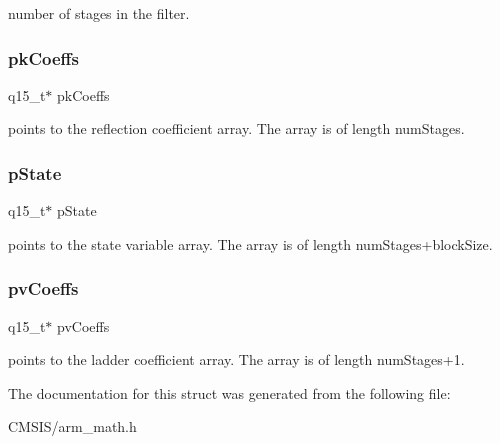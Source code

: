 number of stages in the filter. \mbox{\label{structarm__iir__lattice__instance__q15_a12497c299b0341c18d497f8ab3465084}} 
\subsubsection{\texorpdfstring{pkCoeffs}{pkCoeffs}}
{\footnotesize\ttfamily q15\+\_\+t$\ast$ pk\+Coeffs}

points to the reflection coefficient array. The array is of length num\+Stages. \mbox{\label{structarm__iir__lattice__instance__q15_ae29dfdb736374fcddaeaec4b7770170c}} 
\subsubsection{\texorpdfstring{pState}{pState}}
{\footnotesize\ttfamily q15\+\_\+t$\ast$ p\+State}

points to the state variable array. The array is of length num\+Stages+block\+Size. \mbox{\label{structarm__iir__lattice__instance__q15_a52866ed127c7b2a8a102e2ed1a2ebab8}} 
\subsubsection{\texorpdfstring{pvCoeffs}{pvCoeffs}}
{\footnotesize\ttfamily q15\+\_\+t$\ast$ pv\+Coeffs}

points to the ladder coefficient array. The array is of length num\+Stages+1. 

The documentation for this struct was generated from the following file\+:\begin{DoxyCompactItemize}
\item 
C\+M\+S\+I\+S/arm\+\_\+math.\+h\end{DoxyCompactItemize}
